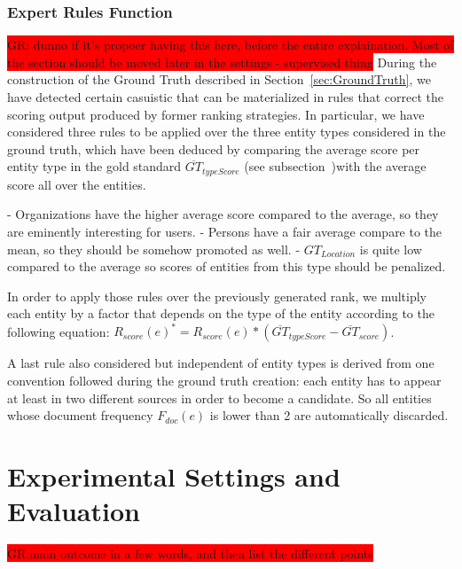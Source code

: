 \documentclass{llncs}
\newcommand{\todo}[1]{\colorbox{red}{#1}}
\begin{document}
\subsubsection{Expert Rules Function}
\todo{GR: dunno if it's propoer having this here, before the entire explaination. Most of the section should be moved later in the settings - supervised thing}
During the construction of the Ground Truth described in Section~\ref{sec:GroundTruth}, we have detected certain casuistic that can be materialized in rules that correct the scoring output produced by former ranking strategies. In particular, we have considered three rules to be applied over the three entity types considered in the ground truth, which have been deduced by comparing the average score per entity type in the gold standard $\overline{GT}_{typeScore}$ (see subsection~\label{sec:LessonsLearned})with the average score all over the entities.

- Organizations have the higher average score compared to the average, so they are eminently interesting for users.
- Persons have a fair average compare to the mean, so they should be somehow promoted as well.
- $GT_{Location}$ is quite low compared to the average so scores of entities from this type should be penalized.

In order to apply those rules over the previously generated rank, we multiply each entity by a factor that depends on the type of the entity according to the following equation: $R_{score}\left ( e \right )^{*} =  R_{score}\left ( e \right ) * (\overline{GT}_{typeScore} - \overline{GT}_{score})$.

A last rule also considered but independent of entity types is derived from one convention followed during the ground truth creation: each entity has to appear at least in two different sources in order to become a candidate. So all entities whose document frequency $F_{doc}(e)$ is lower than 2 are automatically discarded.




\section{Experimental Settings and Evaluation}
\label{sec:Evaluation}
\todo{GR:main outcome in a few words, and then list the different points}
\end{document}
